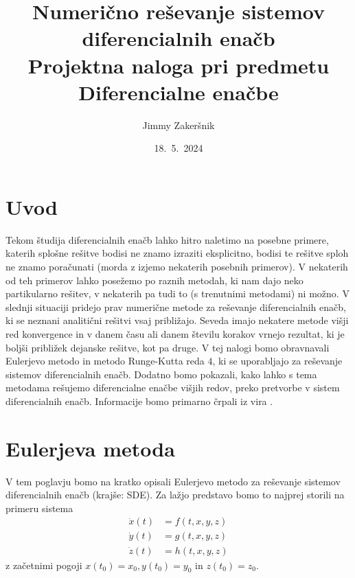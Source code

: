 \documentclass[a4paper, 10pt]{article}
\title{Numerično reševanje sistemov diferencialnih enačb \\ {\large Projektna naloga pri predmetu Diferencialne enačbe}}
\date{18.~5.~2024}
\author{Jimmy Zakeršnik}
\begin{document}
	\maketitle
	\thispagestyle{empty}
	\newpage
	\tableofcontents
	\newpage
	\section{Uvod}
	Tekom študija diferencialnih enačb lahko hitro naletimo na posebne primere, katerih splošne rešitve bodisi ne znamo izraziti eksplicitno, bodisi te rešitve sploh ne znamo poračunati (morda z izjemo nekaterih posebnih primerov). V nekaterih od teh primerov lahko posežemo po raznih metodah, ki nam dajo neko partikularno rešitev, v nekaterih pa tudi to (s trenutnimi metodami) ni možno. V slednji situaciji pridejo prav numerične metode za reševanje diferencialnih enačb, ki se neznani analitični rešitvi vsaj približajo. Seveda imajo nekatere metode višji red konvergence in v danem času ali danem številu korakov vrnejo rezultat, ki je boljši približek dejanske rešitve, kot pa druge. V tej nalogi bomo obravnavali Eulerjevo metodo in metodo Runge-Kutta reda $4$, ki se uporabljajo za reševanje sistemov diferencialnih enačb. Dodatno bomo pokazali, kako lahko s tema metodama rešujemo diferencialne enačbe višjih redov, preko pretvorbe v sistem diferencialnih enačb. Informacije bomo primarno črpali iz vira \cite{bib:Matlab}.
	\section{Eulerjeva metoda}
		V tem poglavju bomo na kratko opisali Eulerjevo metodo za reševanje sistemov diferencialnih enačb (krajše: SDE). Za lažjo predstavo bomo to najprej storili na primeru sistema \begin{align*}
			\dot{x}(t) &= f(t, x, y, z) \\
			\dot{y}(t) &= g(t, x, y, z) \\
			\dot{z}(t) &= h(t, x, y, z)
		\end{align*} z začetnimi pogoji $x(t_0) = x_0, y(t_0) = y_0$ in $z(t_0) = z_0$.
		
\end{document}
